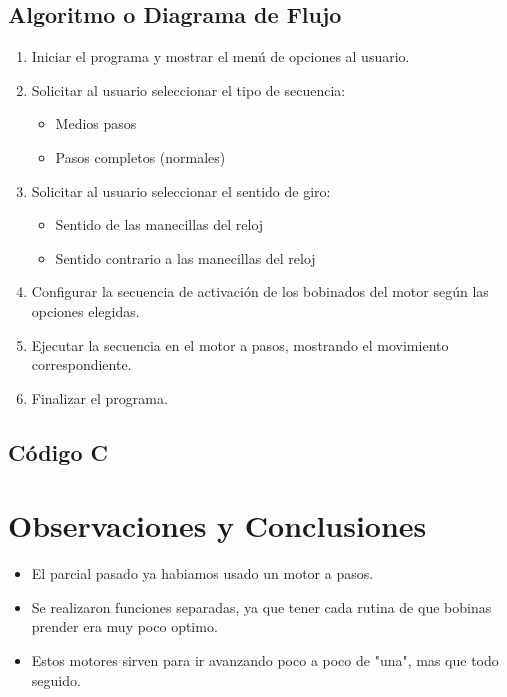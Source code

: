 \documentclass[11pt]{scrartcl}
\begin{document}
\subsection{Algoritmo o Diagrama de Flujo}

\begin{enumerate}
    \item Iniciar el programa y mostrar el menú de opciones al usuario.
    \item Solicitar al usuario seleccionar el tipo de secuencia:
    \begin{itemize}
        \item Medios pasos
        \item Pasos completos (normales)
    \end{itemize}
    \item Solicitar al usuario seleccionar el sentido de giro:
    \begin{itemize}
        \item Sentido de las manecillas del reloj
        \item Sentido contrario a las manecillas del reloj
    \end{itemize}
    \item Configurar la secuencia de activación de los bobinados del motor según las opciones elegidas.
    \item Ejecutar la secuencia en el motor a pasos, mostrando el movimiento correspondiente.
    \item Finalizar el programa.
\end{enumerate}

\subsection{ Código C}




\section{Observaciones y Conclusiones}

\begin{itemize}
    \item El parcial pasado ya habiamos usado un motor a pasos. 
    \item Se realizaron funciones separadas, ya que tener cada rutina de que bobinas prender era muy poco optimo.
    \item Estos motores sirven para ir avanzando poco a poco de "una", mas que todo seguido. 
\end{itemize}
  

    
\end{document}

